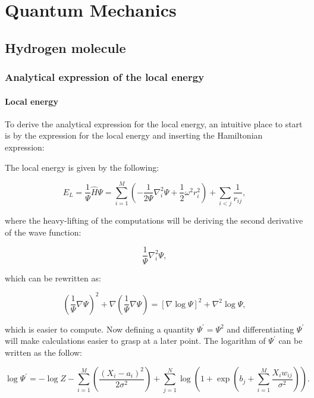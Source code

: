 \documentclass[../main.tex]{subfiles}
\begin{document}
\chapter{Quantum Mechanics}
\label{sec:second-app}
\section{Hydrogen molecule}
\subsection{Analytical expression of the local energy}
\subsubsection{Local energy}
To derive the analytical expression for the local energy, an intuitive place to start is by the expression for the local energy and inserting the Hamiltonian expression:

The local energy is given by the following:

\begin{equation}
	E_L=\frac{1}{\Psi}\hat{H}\Psi= \sum_{i=1}^M \left(-\frac{1}{2\Psi}\nabla_i^2 \Psi + \frac{1}{2}\omega^2 r_i^2\right)+\sum_{i<j} \frac{1}{r_{ij}},
	\label{eq:ap_LE}
\end{equation}

where the heavy-lifting of the computations will be deriving the second derivative of the wave function:

\begin{equation*}
	\frac{1}{\Psi}\nabla_i^2 \Psi,
\end{equation*}

which can be rewritten as:

\begin{equation*}
	\left(\frac{1}{\Psi}\nabla \Psi\right)^2+\nabla \left(\frac{1}{\Psi}\nabla \Psi \right)=\left[\nabla \log \Psi\right]^2 + \nabla^2 \log \Psi,
	\label{eq:letre}
\end{equation*}

which is easier to compute. Now defining a quantity $\Psi^{\prime}=\Psi^2$ and differentiating $\Psi^{\prime}$ will make calculations easier to grasp at a later point. The logarithm of $\Psi^{\prime}$ can be written as the follow:

\begin{equation*}
	\log \Psi^{\prime} = -\log Z -\sum_{i=1}^M \left(\frac{(X_i-a_i)^2}{2\sigma^2}\right)+\sum_{j=1}^N \log \left(1+\exp \left(b_j+\sum_{i=1}^{M} \frac{X_iw_{ij}}{\sigma^2}\right)\right).
	\label{eq:logpsi}
\end{equation*}
\end{document}
